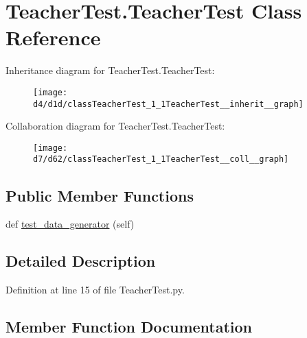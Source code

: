 \hypertarget{classTeacherTest_1_1TeacherTest}{}\section{Teacher\+Test.\+Teacher\+Test Class Reference}
\label{classTeacherTest_1_1TeacherTest}


Inheritance diagram for Teacher\+Test.\+Teacher\+Test\+:\nopagebreak
\begin{figure}[H]
\begin{center}
\leavevmode
\texttt{[image: d4/d1d/classTeacherTest\_1\_1TeacherTest\_\_inherit\_\_graph]}
\end{center}
\end{figure}


Collaboration diagram for Teacher\+Test.\+Teacher\+Test\+:\nopagebreak
\begin{figure}[H]
\begin{center}
\leavevmode
\texttt{[image: d7/d62/classTeacherTest\_1\_1TeacherTest\_\_coll\_\_graph]}
\end{center}
\end{figure}
\subsection*{Public Member Functions}
\begin{DoxyCompactItemize}
\item 
def \hyperlink{classTeacherTest_1_1TeacherTest_aeb5a6c83bfa0e5eb8d8fad13789421aa}{test\+\_\+data\+\_\+generator} (self)
\end{DoxyCompactItemize}


\subsection{Detailed Description}


Definition at line 15 of file Teacher\+Test.\+py.



\subsection{Member Function Documentation}
\mbox{\label{classTeacherTest_1_1TeacherTest_aeb5a6c83bfa0e5eb8d8fad13789421aa}} 
